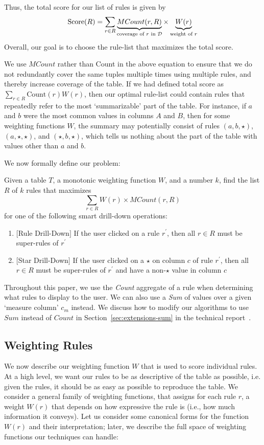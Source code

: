 Thus, the total score for our list of rules is given by 
$$\text{Score}(R) = \sum_{r \in R} \underbrace{MCount(r, R)}_{\text{coverage of $r$ in $\mathcal{D}$}} \times \underbrace{W(r)}_{\text{weight of $r$}}$$ 
Overall, our goal is to choose the rule-list that maximizes the 
total score. 


We use $MCount$ rather than Count in the above equation to ensure that we do not redundantly cover
the same tuples multiple times using multiple rules, and thereby increase coverage of the table. 
If we had defined total score as $\sum_{r \in R} \text{Count}(r)W(r)$, then our optimal rule-list could 
contain rules that repeatedly refer to the most `summarizable' part of the table. 
For instance, if $a$ and $b$ were the most common values in columns $A$ and $B$, then 
for some weighting functions $W$, 
the summary may potentially consist of rules $(a, b, \star)$, $(a, \star, \star)$, and $(\star, b, \star)$, which tells us nothing about the part of the table with values other than $a$ and $b$.

 We now formally define our problem:
\begin{problem}\label{prob:optimal-subrule-list}
Given a table $T$, a monotonic weighting function $W$, and a number $k$, find the list $R$ of $k$ rules that maximizes 
$$\sum_{r \in R} W(r) \times MCount(r,R)$$
for one of the following smart drill-down operations:
\begin{enumerate}
\item $[$Rule Drill-Down$]$ If the user clicked on a rule $r^{\prime}$, then all $r \in R$ must be super-rules of $r^{\prime}$
\item $[$Star Drill-Down$]$ If the user clicked on a $\star$ on column $c$ of rule $r^{\prime}$, then all $r \in R$ must be super-rules of $r^{\prime}$ and have a non-$\star$ value in column $c$
\end{enumerate}
\end{problem}
Throughout this paper, we use the {\em Count} aggregate of a rule when determining what rules to display to the user. We can also use a {\em Sum} of values over a given `measure column' $c_m$ instead. We discuss how to modify our algorithms to use $Sum$ instead of $Count$ in Section~\ref{sec:extensions-sum} in the technical report~\cite{tr}.



\subsection{Weighting Rules}
\label{sec:weighting}
We now describe our weighting function $W$ that is used to score individual rules. 
At a high level, we want our rules to be as descriptive of the table as possible, i.e. given the rules, it should be as easy as possible to reproduce the table. We consider a general family of weighting functions, that assigns for each rule $r$, a weight $W(r)$ that depends on how expressive the rule is (i.e., how much information
it conveys). Let us consider some canonical forms for the function $W(r)$ and their interpretation; later, we describe the full
space of weighting functions our techniques can handle:

